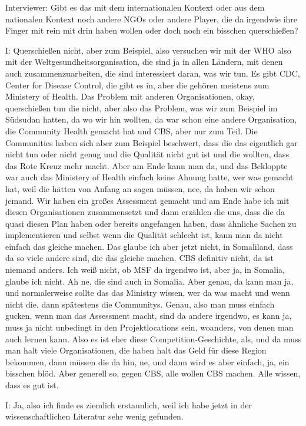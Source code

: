 Interviewer: Gibt es das mit dem internationalen Kontext oder aus dem nationalen Kontext noch andere NGOs oder andere Player, die da irgendwie ihre Finger mit rein mit drin haben wollen oder doch noch ein bisschen querschießen?

I: Querschießen nicht, aber zum Beispiel, also versuchen wir mit der WHO also mit der Weltgesundheitsorganisation, die sind ja in allen Ländern, mit denen auch zusammenzuarbeiten, die sind interessiert daran, was wir tun. Es gibt CDC, Center for Disease Control, die gibt es in, aber die gehören meistens zum Ministery of Health. Das Problem mit anderen Organisationen, okay, querschießen tun die nicht, aber also das Problem, was wir zum Beispiel im Südsudan hatten, da wo wir hin wollten, da war schon eine andere Organisation, die Community Health gemacht hat und CBS, aber nur zum Teil. Die Communities haben sich aber zum Beispiel beschwert, dass die das eigentlich gar nicht tun oder nicht genug und die Qualität nicht gut ist und die wollten, dass das Rote Kreuz mehr macht. Aber am Ende kann man da, und das Bekloppte war auch das Ministery of Health einfach keine Ahnung hatte, wer was gemacht hat, weil die hätten von Anfang an sagen müssen, nee, da haben wir schon jemand. Wir haben ein großes Assessment gemacht und am Ende habe ich mit diesen Organisationen zusammensetzt und dann erzählen die uns, dass die da quasi diesen Plan haben oder bereits angefangen haben, dass ähnliche Sachen zu implementieren und selbst wenn die Qualität schlecht ist, kann man da nicht einfach das gleiche machen. Das glaube ich aber jetzt nicht, in Somaliland, dass da so viele andere sind, die das gleiche machen. CBS definitiv nicht, da ist niemand anders. Ich weiß nicht, ob MSF da irgendwo ist, aber ja, in Somalia, glaube ich nicht. Ah ne, die sind auch in Somalia. Aber genau, da kann man ja, und normalerweise sollte das das Ministry wissen, wer da was macht und wenn nicht die, dann spätestens die Communitys. Genau, also man muss einfach gucken, wenn man das Assessment macht, sind da andere irgendwo, es kann ja, muss ja nicht unbedingt in den Projektlocations sein, woanders, von denen man auch lernen kann. Also es ist eher diese Competition-Geschichte, als, und da muss man halt viele Organisationen, die haben halt das Geld für diese Region bekommen, dann müssen die da hin, ne, und dann wird es aber einfach, ja, ein bisschen blöd. Aber generell so, gegen CBS, alle wollen CBS machen. Alle wissen, dass es gut ist. 

I: Ja, also ich finde es ziemlich erstaunlich, weil ich habe jetzt in der wissenschaftlichen Literatur sehr wenig gefunden.

